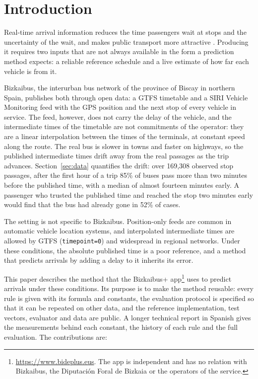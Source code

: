 \documentclass[preprint,11pt,nonatbib]{elsarticle}
\begin{document}
\section{Introduction}
\label{sec:intro}

Real-time arrival information reduces the time passengers wait at stops and the uncertainty of the wait, and makes
public transport more attractive \parencite{watkins2011,brakewood2019}. Producing it requires two inputs that are not
always available in the form a prediction method expects: a reliable reference schedule and a live estimate of how
far each vehicle is from it.

Bizkaibus, the interurban bus network of the province of Biscay in northern Spain, publishes both through open
data: a GTFS timetable \parencite{gtfs} and a SIRI Vehicle Monitoring feed \parencite{siri} with the GPS position and
the next stop of every vehicle in service. The feed, however, does not carry the delay of the vehicle, and the
intermediate times of the timetable are not commitments of the operator: they are a linear interpolation between
the times of the terminals, at constant speed along the route. The real bus is slower in towns and faster on
highways, so the published intermediate times drift away from the real passages as the trip advances.
Section~\ref{sec:data} quantifies the drift: over 169,308 observed stop passages, after the first hour of a trip 85\%
of buses pass more than two minutes before the published time, with a median of almost fourteen minutes early. A
passenger who trusted the published time and reached the stop two minutes early would find that the bus had already
gone in 52\% of cases.

The setting is not specific to Bizkaibus. Position-only feeds are common in automatic vehicle location systems, and
interpolated intermediate times are allowed by GTFS (\texttt{timepoint=0}) and widespread in regional networks. Under
these conditions, the absolute published time is a poor reference, and a method that predicts arrivals by adding a
delay to it inherits its error.

This paper describes the method that the Bizkaibus+ app\footnote{\url{https://www.bideplus.eus}. The app is
independent and has no relation with Bizkaibus, the Diputación Foral de Bizkaia or the operators of the service.}
uses to predict arrivals under these conditions. Its purpose is to make the method reusable: every rule is given with
its formula and constants, the evaluation protocol is specified so that it can be repeated on other data, and the
reference implementation, test vectors, evaluator and data are public. A longer technical report in Spanish
\parencite{garrido2026memoria} gives the measurements behind each constant, the history of each rule and the full
evaluation. The contributions are:
\end{document}
